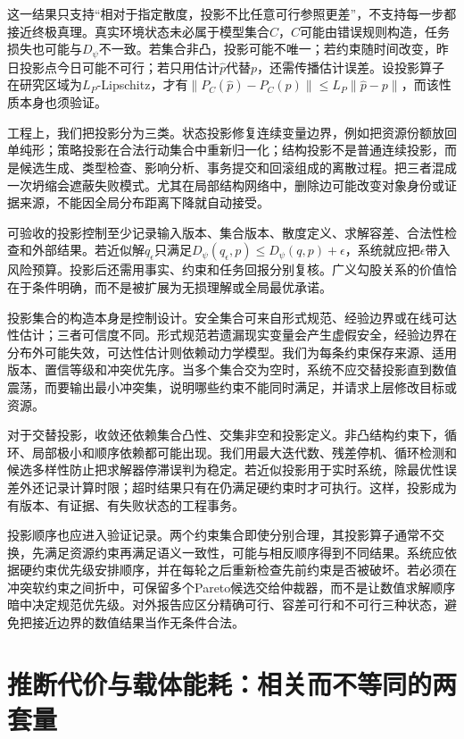 这一结果只支持“相对于指定散度，投影不比任意可行参照更差”，不支持每一步都接近终极真理。真实环境状态未必属于模型集合$C$，$C$可能由错误规则构造，任务损失也可能与$D_\psi$不一致。若集合非凸，投影可能不唯一；若约束随时间改变，昨日投影点今日可能不可行；若只用估计$\hat p$代替$p$，还需传播估计误差。设投影算子在研究区域为$L_P$-Lipschitz，才有$\|P_C(\hat p)-P_C(p)\|\le L_P\|\hat p-p\|$，而该性质本身也须验证。

工程上，我们把投影分为三类。状态投影修复连续变量边界，例如把资源份额放回单纯形；策略投影在合法行动集合中重新归一化；结构投影不是普通连续投影，而是候选生成、类型检查、影响分析、事务提交和回滚组成的离散过程。把三者混成一次坍缩会遮蔽失败模式。尤其在局部结构网络中，删除边可能改变对象身份或证据来源，不能因全局分布距离下降就自动接受。

可验收的投影控制至少记录输入版本、集合版本、散度定义、求解容差、合法性检查和外部结果。若近似解$q_\epsilon$只满足$D_\psi(q_\epsilon,p)\le D_\psi(q,p)+\epsilon$，系统就应把$\epsilon$带入风险预算。投影后还需用事实、约束和任务回报分别复核。广义勾股关系的价值恰在于条件明确，而不是被扩展为无损理解或全局最优承诺。

投影集合的构造本身是控制设计。安全集合可来自形式规范、经验边界或在线可达性估计；三者可信度不同。形式规范若遗漏现实变量会产生虚假安全，经验边界在分布外可能失效，可达性估计则依赖动力学模型。我们为每条约束保存来源、适用版本、置信等级和冲突优先序。当多个集合交为空时，系统不应交替投影直到数值震荡，而要输出最小冲突集，说明哪些约束不能同时满足，并请求上层修改目标或资源。

对于交替投影，收敛还依赖集合凸性、交集非空和投影定义。非凸结构约束下，循环、局部极小和顺序依赖都可能出现。我们用最大迭代数、残差停机、循环检测和候选多样性防止把求解器停滞误判为稳定。若近似投影用于实时系统，除最优性误差外还记录计算时限；超时结果只有在仍满足硬约束时才可执行。这样，投影成为有版本、有证据、有失败状态的工程事务。

投影顺序也应进入验证记录。两个约束集合即使分别合理，其投影算子通常不交换，先满足资源约束再满足语义一致性，可能与相反顺序得到不同结果。系统应依据硬约束优先级安排顺序，并在每轮之后重新检查先前约束是否被破坏。若必须在冲突软约束之间折中，可保留多个Pareto候选交给仲裁器，而不是让数值求解顺序暗中决定规范优先级。对外报告应区分精确可行、容差可行和不可行三种状态，避免把接近边界的数值结果当作无条件合法。

\section{推断代价与载体能耗：相关而不等同的两套量}
\label{sec:cognitive_impedance_least_action}

